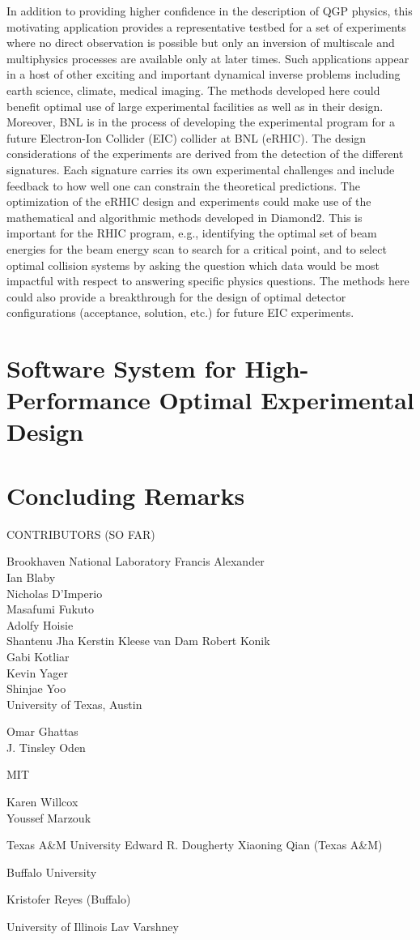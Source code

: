 \documentclass[11pt]{article}
\begin{document}
 In addition to providing higher confidence in the
description of QGP physics, this motivating application provides a
representative testbed for a set of experiments where no direct
observation is possible but only an inversion of multiscale and
multiphysics processes are available only at later times.  Such
applications appear in a host of other exciting and important
dynamical inverse problems including earth science, climate, medical
imaging. The methods developed here could benefit optimal use of large
experimental facilities as well as in their design.  Moreover, BNL is
in the process of developing the experimental program for a future
Electron-Ion Collider (EIC) collider at BNL (eRHIC). The design
considerations of the experiments are derived from the detection of
the different signatures. Each signature carries its own experimental
challenges and include feedback to how well one can constrain the
theoretical predictions.  The optimization of the eRHIC design and
experiments could make use of the mathematical and algorithmic methods
developed in Diamond2.  This is important for the RHIC program, e.g.,
identifying the optimal set of beam energies for the beam energy scan
to search for a critical point, and to select optimal collision
systems by asking the question which data would be most impactful with
respect to answering specific physics questions.  The methods here
could also provide a breakthrough for the design of optimal detector
configurations (acceptance, solution, etc.) for future EIC
experiments.




\section{Software System for High-Performance Optimal Experimental Design}

\section{Concluding Remarks}

\newpage



\begin{center}
CONTRIBUTORS (SO FAR)
\end{center}

Brookhaven National Laboratory
Francis Alexander \\
Ian Blaby\\
Nicholas D'Imperio\\
Masafumi Fukuto\\
Adolfy Hoisie\\
Shantenu Jha
Kerstin Kleese van Dam
Robert Konik\\
Gabi Kotliar\\
Kevin Yager\\
Shinjae Yoo\\
 
University of Texas, Austin

Omar Ghattas\\
J. Tinsley Oden

MIT

Karen Willcox\\
Youssef Marzouk


Texas A\&M University
Edward R. Dougherty
Xiaoning Qian (Texas A\&M)

Buffalo University

Kristofer Reyes (Buffalo)

University of Illinois
Lav Varshney 
\end{document}
